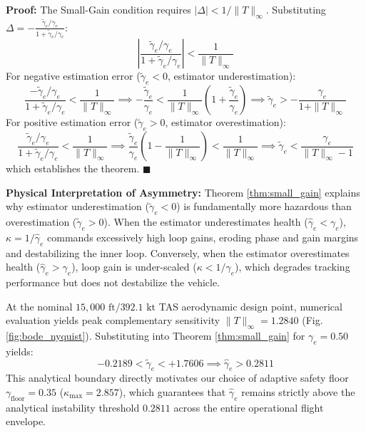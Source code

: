\documentclass[review,12pt]{elsarticle}
\begin{document}
\noindent\textbf{Proof:} The Small-Gain condition requires $|\Delta| < 1/\|T\|_\infty$. Substituting $\Delta = -\frac{\tilde{\gamma}_e / \gamma_e}{1 + \tilde{\gamma}_e / \gamma_e}$:
\begin{equation}
    \left| \frac{\tilde{\gamma}_e / \gamma_e}{1 + \tilde{\gamma}_e / \gamma_e} \right| < \frac{1}{\|T\|_\infty}
\end{equation}
For negative estimation error ($\tilde{\gamma}_e < 0$, estimator underestimation):
\begin{equation}
    \frac{-\tilde{\gamma}_e / \gamma_e}{1 + \tilde{\gamma}_e / \gamma_e} < \frac{1}{\|T\|_\infty} \implies -\frac{\tilde{\gamma}_e}{\gamma_e} < \frac{1}{\|T\|_\infty} \left(1 + \frac{\tilde{\gamma}_e}{\gamma_e}\right) \implies \tilde{\gamma}_e > -\frac{\gamma_e}{1 + \|T\|_\infty}
\end{equation}
For positive estimation error ($\tilde{\gamma}_e > 0$, estimator overestimation):
\begin{equation}
    \frac{\tilde{\gamma}_e / \gamma_e}{1 + \tilde{\gamma}_e / \gamma_e} < \frac{1}{\|T\|_\infty} \implies \frac{\tilde{\gamma}_e}{\gamma_e} \left(1 - \frac{1}{\|T\|_\infty}\right) < \frac{1}{\|T\|_\infty} \implies \tilde{\gamma}_e < \frac{\gamma_e}{\|T\|_\infty - 1}
\end{equation}
which establishes the theorem. $\blacksquare$

\noindent\textbf{Physical Interpretation of Asymmetry:} Theorem \ref{thm:small_gain} explains why estimator underestimation ($\tilde{\gamma}_e < 0$) is fundamentally more hazardous than overestimation ($\tilde{\gamma}_e > 0$). When the estimator underestimates health ($\hat{\gamma}_e < \gamma_e$), $\kappa = 1/\hat{\gamma}_e$ commands excessively high loop gains, eroding phase and gain margins and destabilizing the inner loop. Conversely, when the estimator overestimates health ($\hat{\gamma}_e > \gamma_e$), loop gain is under-scaled ($\kappa < 1/\gamma_e$), which degrades tracking performance but does not destabilize the vehicle.

At the nominal $15{,}000\text{ ft} / 392.1\text{ kt}$ TAS aerodynamic design point, numerical evaluation yields peak complementary sensitivity $\|T\|_\infty = 1.2840$ (Fig. \ref{fig:bode_nyquist}). Substituting into Theorem \ref{thm:small_gain} for $\gamma_e = 0.50$ yields:
\begin{equation}
    -0.2189 < \tilde{\gamma}_e < +1.7606 \implies \hat{\gamma}_e > 0.2811
\end{equation}
This analytical boundary directly motivates our choice of adaptive safety floor $\gamma_{\text{floor}} = 0.35$ ($\kappa_{\max} = 2.857$), which guarantees that $\hat{\gamma}_e$ remains strictly above the analytical instability threshold $0.2811$ across the entire operational flight envelope.
\end{document}
